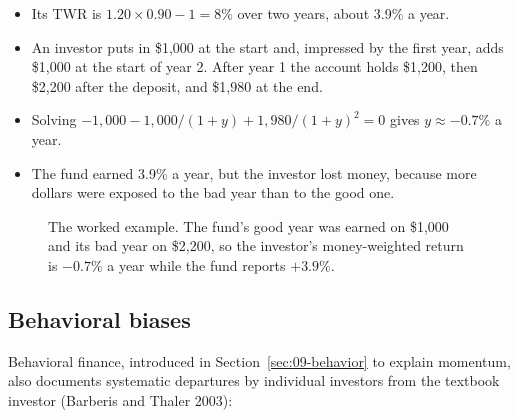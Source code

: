 \begin{itemize}
  \item Its TWR is $1.20 \times 0.90 - 1 = 8\%$ over two years, about 3.9\% a year.
  \item An investor puts in \$1,000 at the start and, impressed by the first year, adds \$1,000 at the start of year 2. After year 1 the account holds \$1,200, then \$2,200 after the deposit, and \$1,980 at the end.
  \item Solving $-1{,}000 - 1{,}000/(1 + y) + 1{,}980/(1 + y)^2 = 0$ gives $y \approx -0.7\%$ a year.
  \item The fund earned 3.9\% a year, but the investor lost money, because more dollars were exposed to the bad year than to the good one.
\end{itemize}

\begin{figure}[htbp]
\centering
{}
\caption{The worked example. The fund's good year was earned on \$1,000 and its bad year on \$2,200, so the investor's money-weighted return is $-0.7\%$ a year while the fund reports $+3.9\%$.}
\label{fig:24-twr}
\end{figure}

\subsection{Behavioral biases}

Behavioral finance, introduced in Section~\ref{sec:09-behavior} to explain momentum, also documents systematic departures by individual investors from the textbook investor (Barberis and Thaler 2003):

